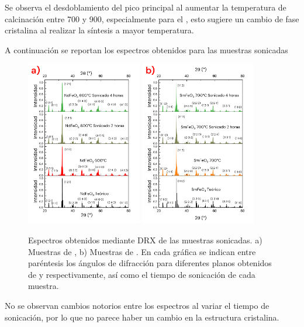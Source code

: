 \documentclass[../main.tex]{subfiles}
\begin{document}
Se observa el desdoblamiento del pico principal al aumentar la temperatura de calcinación entre 700 y 900\gradoC{}, especialmente para el \neod{}, esto sugiere un cambio de fase cristalina al realizar la síntesis a mayor temperatura.

A continuación se reportan los espectros obtenidos para las muestras sonicadas
\begin{figure}[H]
    \centering
    \includegraphics[width=0.45\textwidth]{fig/drxsonicndfeo3.png}
    \quad
    \includegraphics[width=0.45\textwidth]{fig/drxsonicsmfeo3.png}
    \caption{Espectros obtenidos mediante DRX de las muestras sonicadas. a) Muestras de \neod{}, b) Muestras de \sama{}. En cada gráfica se indican entre paréntesis los ángulos de difracción para diferentes planos obtenidos de \cite{ndfeo3} y \cite{smfeo3} respectivamente, así como el tiempo de sonicación de cada muestra.}
    \label{fig:drxsoniccomp}
\end{figure}
No se observan cambios notorios entre los espectros al variar el tiempo de sonicación, por lo que no parece haber un cambio en la estructura cristalina.
\end{document}
